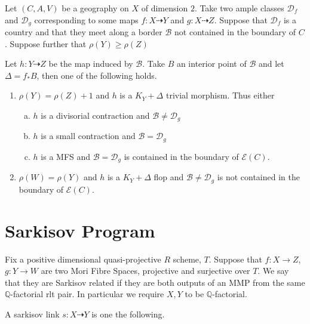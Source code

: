\documentclass[a4paper,12pt]{amsart}
\begin{document}
	
	\begin{lemma}\cite[Lemma 3.5]{hacon2009sarkisov}\label{links}
		Let $(C,A,V)$ be a geography on $X$ of dimension $2$. Take two ample classes $\mathcal{D}_{f}$ and $\mathcal{D}_{g}$ corresponding to some maps $f:X \dashrightarrow Y$ and $g: X\dashrightarrow Z$. Suppose that $\mathcal{D}_{f}$ is a country and that they meet along a border $\mathcal{B}$ not contained in the boundary of $C$. Suppose further that $\rho(Y) \geq \rho(Z)$
		
		Let $h: Y \dashrightarrow Z$ be the map induced by $\mathcal{B}$. Take $B$ an interior point of $\mathcal{B}$ and let $\Delta=f_{*}B$, then one of the following holds.
			\begin{enumerate}
			\item $\rho(Y)=\rho(Z)+1$ and $h$ is a $K_{Y}+\Delta$ trivial morphism. Thus either
			\begin{enumerate}[a)]
				\item $h$ is a divisorial contraction and $\mathcal{B} \neq \mathcal{D}_{g}$
				\item $h$ is a small contraction and $\mathcal{B}=\mathcal{D}_{g}$
				\item $h$ is a MFS and $\mathcal{B}=\mathcal{D}_{g}$ is contained in the boundary of $\mathcal{E}(C)$.
			\end{enumerate}
			\item $\rho(W)=\rho(Y)$ and $h$ is a $K_{Y}+\Delta$ flop and $\mathcal{B} \neq \mathcal{D}_{g}$ is not contained in the boundary of $\mathcal{E}(C)$.
		\end{enumerate}
	\end{lemma}
	
	

\section{Sarkisov Program} \label{Sarkisov-section}

Fix a positive dimensional quasi-projective $R$ scheme, $T$. Suppose that $f:X \to Z$, $g:Y \to W$ are two Mori Fibre Spaces, projective and surjective over $T$. We say that they are Sarkisov related if they are both outputs of an MMP from the same $\mathbb{Q}$-factorial rlt pair. In particular we require $X,Y$ to be $\mathbb{Q}$-factorial. 

A sarkisov link $s:X \dashrightarrow Y$ is one the following.
\end{document}
